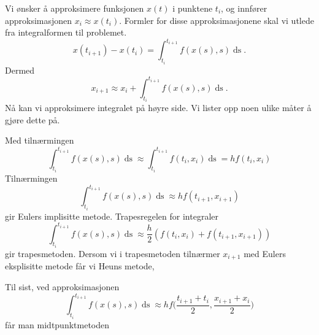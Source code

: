 \documentclass{article}
\theoremstyle{plain}
\theoremstyle{definition}
\theoremstyle{remark}
\newcommand{\diff}[1]{\mathop{d#1}}
\newcommand{\bigparanth}[1]{\big(#1\big)}
\begin{document}
Vi ønsker å approksimere funksjonen $x(t)$ i punktene $t_i$, og innfører approksimasjonen $x_i \approx x(t_i)$. Formler for disse approksimasjonene skal vi utlede fra integralformen til problemet.
\begin{equation*}
    x(t_{i+1}) - x(t_i) = \int_{t_i}^{t_{i+1}} f(x(s), s) \diff{s}.
\end{equation*}
Dermed
\begin{equation*}
    x_{i+1} \approx x_i + \int_{t_i}^{t_{i+1}} f(x(s), s) \diff{s}.
\end{equation*}
Nå kan vi approksimere integralet på høyre side. Vi lister opp noen ulike måter å gjøre dette på.

Med tilnærmingen
\begin{equation*}
    \int_{t_i}^{t_{i+1}} f(x(s), s) \diff{s} \approx \int_{t_i}^{t_{i+1}} f(t_i, x_i) \diff{s} = h f(t_i, x_i)
\end{equation*}
Tilnærmingen
\begin{equation*}
    \int_{t_i}^{t_{i+1}} f(x(s), s) \diff{s} \approx h f(t_{i+1}, x_{i+1})
\end{equation*}
gir Eulers implisitte metode. Trapesregelen for integraler
\begin{equation*}
    \int_{t_i}^{t_{i+1}} f(x(s), s) \diff{s} \approx \frac{h}{2} (f(t_{i}, x_{i}) + f(t_{i+1}, x_{i+1}))
\end{equation*}
gir trapesmetoden. Dersom vi i trapesmetoden tilnærmer $x_{i+1}$ med Eulers eksplisitte metode får vi Heuns metode,

Til sist, ved approksimasjonen
\begin{equation*}
    \int_{t_i}^{t_{i+1}} f(x(s), s) \diff{s} \approx h f\bigparanth{\frac{t_{i+1} + t_i}{2}, \frac{x_{i+1} + x_i}{2}}
\end{equation*}
får man midtpunktmetoden
\end{document}
